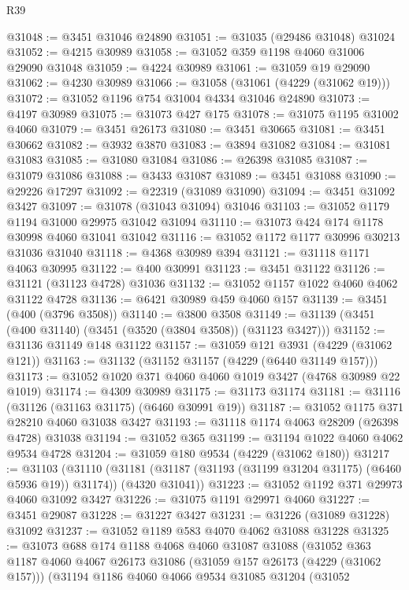 \begin{lexlean}{R39}
\begin{coremodule}
@31048 := @3451 @31046 @24890
@31051 := @31035 (@29486 @31048) @31024
@31052 := @4215 @30989
@31058 := @31052 @359 @1198 @4060 @31006 @29090 @31048
@31059 := @4224 @30989
@31061 := @31059 @19 @29090
@31062 := @4230 @30989
@31066 := @31058 (@31061 (@4229 (@31062 @19)))
@31072 := @31052 @1196 @754 @31004 @4334 @31046 @24890
@31073 := @4197 @30989
@31075 := @31073 @427 @175
@31078 := @31075 @1195 @31002 @4060
@31079 := @3451 @26173
@31080 := @3451 @30665
@31081 := @3451 @30662
@31082 := @3932 @3870
@31083 := @3894 @31082
@31084 := @31081 @31083
@31085 := @31080 @31084
@31086 := @26398 @31085
@31087 := @31079 @31086
@31088 := @3433 @31087
@31089 := @3451 @31088
@31090 := @29226 @17297
@31092 := @22319 (@31089 @31090)
@31094 := @3451 @31092 @3427
@31097 := @31078 (@31043 @31094) @31046
@31103 := @31052 @1179 @1194 @31000 @29975 @31042 @31094
@31110 := @31073 @424 @174 @1178 @30998 @4060 @31041 @31042
@31116 := @31052 @1172 @1177 @30996 @30213 @31036 @31040
@31118 := @4368 @30989 @394
@31121 := @31118 @1171 @4063 @30995
@31122 := @400 @30991
@31123 := @3451 @31122
@31126 := @31121 (@31123 @4728) @31036
@31132 := @31052 @1157 @1022 @4060 @4062 @31122 @4728
@31136 := @6421 @30989 @459 @4060 @157
@31139 := @3451 (@400 (@3796 @3508))
@31140 := @3800 @3508
@31149 := @31139 (@3451 (@400 @31140) (@3451 (@3520 (@3804 @3508)) (@31123 @3427)))
@31152 := @31136 @31149 @148 @31122
@31157 := @31059 @121 @3931 (@4229 (@31062 @121))
@31163 := @31132 (@31152 @31157 (@4229 (@6440 @31149 @157)))
@31173 := @31052 @1020 @371 @4060 @4060 @1019 @3427 (@4768 @30989 @22 @1019)
@31174 := @4309 @30989
@31175 := @31173 @31174
@31181 := @31116 (@31126 (@31163 @31175) (@6460 @30991 @19))
@31187 := @31052 @1175 @371 @28210 @4060 @31038 @3427
@31193 := @31118 @1174 @4063 @28209 (@26398 @4728) @31038
@31194 := @31052 @365
@31199 := @31194 @1022 @4060 @4062 @9534 @4728
@31204 := @31059 @180 @9534 (@4229 (@31062 @180))
@31217 := @31103
    (@31110
      (@31181 (@31187 (@31193 (@31199 @31204 @31175) (@6460 @5936 @19)) @31174))
      (@4320 @31041))
@31223 := @31052 @1192 @371 @29973 @4060 @31092 @3427
@31226 := @31075 @1191 @29971 @4060
@31227 := @3451 @29087
@31228 := @31227 @3427
@31231 := @31226 (@31089 @31228) @31092
@31237 := @31052 @1189 @583 @4070 @4062 @31088 @31228
@31325 := @31073
    @688
    @174
    @1188
    @4068
    @4060
    @31087
    @31088
    (@31052
      @363
      @1187
      @4060
      @4067
      @26173
      @31086
      (@31059 @157 @26173 (@4229 (@31062 @157)))
      (@31194
        @1186
        @4060
        @4066
        @9534
        @31085
        @31204
        (@31052

\end{coremodule}
\end{lexlean}
